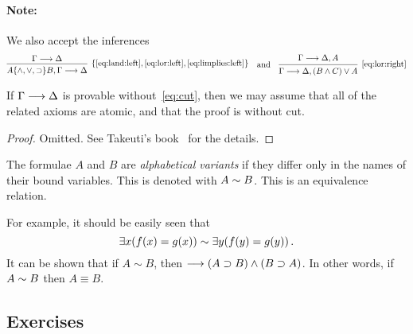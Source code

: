 \documentclass[11pt,a4paper]{article}
\begin{document}
\paragraph{Note:}
We also accept the inferences
\begin{equation*}
    \begin{prooftree}
        \hypo{\Gamma\seq\Delta}
        \infer1[\(\set{\eqref{eq:land:left},\eqref{eq:lor:left},\eqref{eq:limplies:left}}\)]{A\set{\land,\lor,\limplies } B, \Gamma\seq \Delta}
    \end{prooftree}
    \quad\text{and}\quad
    \begin{prooftree}
        \hypo{\Gamma\seq\Delta, A}
        \infer1[\eqref{eq:lor:right}]{\Gamma\seq\Delta, \arcs{B\land C}\lor A}
    \end{prooftree}
\end{equation*}

\begin{proposition}\label{prop:if provable, then atomic}
    If \(\Gamma\longrightarrow\Delta\) is provable without~\eqref{eq:cut},
    then we may assume that all of the related axioms are atomic,
    and that the proof is without cut.
\end{proposition}

\begin{proof}
    Omitted. See Takeuti's book~\cite[14-17]{Takeuti-1987} for the details.
\end{proof}

\begin{definition}\label{def:alphabetical variants}
    The formulae \(A\) and \(B\) are \emph{alphabetical variants}
    if they differ only in the names of their bound variables.
    This is denoted with \(A\sim{B}\). This is an equivalence relation.
\end{definition}

For example, it should be easily seen that
\begin{equation*}
    \exists x(f(x) = g(x)) \sim\exists y(f(y) = g(y))\,.
\end{equation*}
It can be shown that if \(A\sim B\), then \(\longrightarrow(A\supset B)\land(B\supset A)\).
In other words, if \(A\sim B\) then \(A\equiv B\).



\subsection{Exercises}
\end{document}
